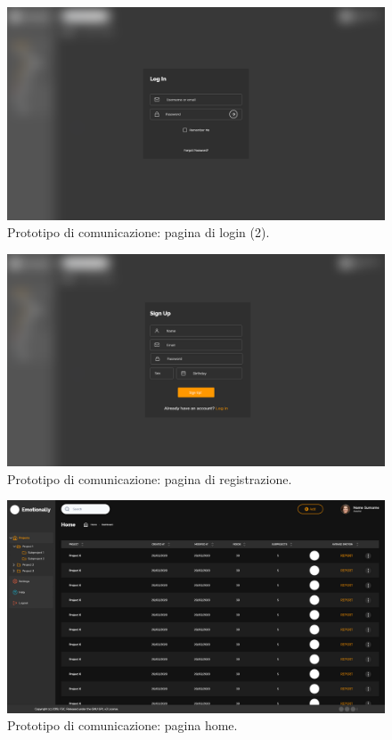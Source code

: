 \begin{figure}[H]
	\centering
	\caption{Prototipo di comunicazione: pagina di login (2).}
	\label{fig:prototipo-comunicazione:login-2}
	\includegraphics[width=\textwidth]{images/prototipo-comunicazione/login (2).png}
\end{figure}

\begin{figure}[H]
	\centering
	\caption{Prototipo di comunicazione: pagina di registrazione.}
	\label{fig:prototipo-comunicazione:registrazione}
	\includegraphics[width=\textwidth]{images/prototipo-comunicazione/registrazione.png}
\end{figure}

\begin{figure}[H]
	\centering
	\caption{Prototipo di comunicazione: pagina home.}
	\label{fig:prototipo-comunicazione:home}
	\includegraphics[width=\textwidth]{images/prototipo-comunicazione/home (no scroll).png}
\end{figure}

